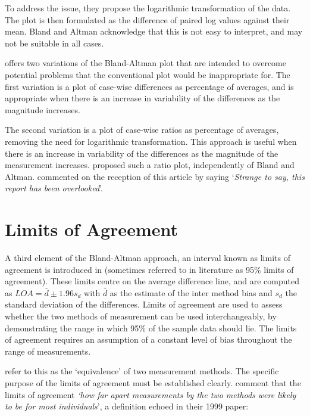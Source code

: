 \documentclass[12pt, a4paper]{report}
\theoremstyle{plain}
\theoremstyle{definition}
\theoremstyle{remark}
\begin{document}
	To address the issue, they propose the logarithmic transformation of the data. The plot is then formulated as the difference of paired log values against their mean. Bland and Altman acknowledge that this is not easy to interpret, and may not be suitable in all cases.
	
	\citet{BA99} offers two variations of the Bland-Altman plot that are intended to overcome potential problems that the conventional plot would be inappropriate for. The first variation is a plot of case-wise differences as percentage of averages, and is appropriate when there is an increase in variability of the differences as the magnitude increases. 
	
	The second variation is a plot of case-wise ratios as percentage of averages, removing the need for logarithmic transformation. This approach is useful when there is an increase in variability of the differences as the magnitude of the measurement increases. \citet{Eksborg} proposed such a ratio plot, independently of Bland and Altman. \citet{Dewitte} commented on the reception of this article by saying `\textit{Strange to say, this report has been overlooked}'.
	
\section{Limits of Agreement}
A third element of the Bland-Altman approach, an interval known
as limits of agreement is introduced in \citet*{BA86} (sometimes referred to in literature as 95\% limits of agreement). These limits centre on the
average difference line, and are computed as $LOA = \bar{d} \pm 1.96 s_{d}$
with $\bar{d}$ as the estimate of the inter method bias and $s_{d}$ the standard deviation of the differences. Limits of agreement are used to assess whether the two methods of measurement can be used interchangeably, by demonstrating the range in which 95\% of the sample data should lie.  The limits of agreement requires an assumption of a constant level of bias throughout the range of measurements. 





\citet{BA86} refer to
this as the `equivalence' of two measurement methods. The specific purpose of the limits of
agreement must be
established clearly. \citet*{BA95} comment that the limits of agreement
\textit{`how
	far apart measurements by the two methods were likely to be for
	most individuals}', a definition echoed in their 1999 paper:
\end{document}
